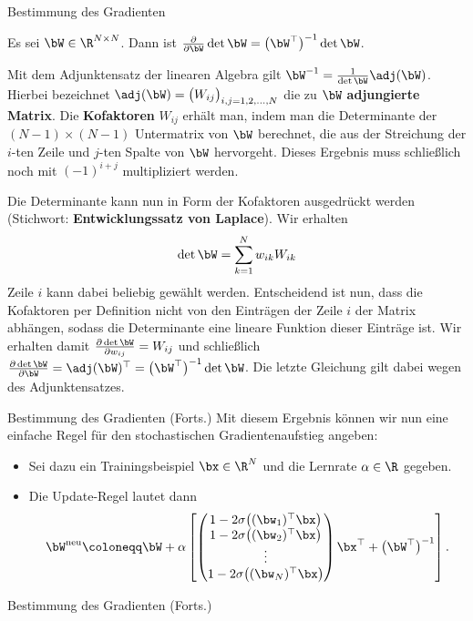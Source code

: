 \begin{frame}{Bestimmung des Gradienten}{}
	\begin{mytheo}
		Es sei $\bW \in \R^{N \times N}$. Dann ist
		$\frac{\partial}{\partial \bW} \det \bW = \bigl( \bW^\top \bigr)^{-1} \det \bW$.
	\end{mytheo}

	\begin{myproof}
		Mit dem Adjunktensatz der linearen Algebra gilt $\bW^{-1} = \frac{1}{\det \bW} \adj(\bW)$.
		Hierbei bezeichnet $\adj(\bW) = \bigl( W_{ij} \bigr)_{i,j = 1, 2, \ldots, N}$ die zu $\bW$ \textbf{adjungierte Matrix}.
		Die \textbf{Kofaktoren} $W_{ij}$ erhält man, indem man die Determinante der
		$(N - 1) \times (N - 1)$ Untermatrix von $\bW$ berechnet, die aus der Streichung der $i$-ten Zeile und $j$-ten Spalte
		von $\bW$ hervorgeht. Dieses Ergebnis muss schließlich noch mit $(-1)^{i + j}$ multipliziert werden.
		
		Die Determinante kann nun in Form der Kofaktoren ausgedrückt werden
		(Stichwort: \textbf{Entwicklungssatz von Laplace}). Wir erhalten
		\begin{equation*}
			\det \bW = \sum_{k = 1}^N w_{ik} W_{ik}
		\end{equation*}
		Zeile $i$ kann dabei beliebig gewählt werden. Entscheidend ist nun, dass die Kofaktoren per Definition
		nicht von den Einträgen der Zeile $i$ der Matrix abhängen, sodass die Determinante eine lineare Funktion
		dieser Einträge ist. Wir erhalten damit
		$\frac{\partial \det \bW}{\partial w_{ij}} = W_{ij}$ und schließlich
		$\frac{\partial \det \bW}{\partial \bW} = \adj(\bW)^\top = \bigl( \bW^\top \bigr)^{-1} \det \bW$.
		Die letzte Gleichung gilt dabei wegen des Adjunktensatzes.
	\end{myproof}
\end{frame}


\begin{frame}{Bestimmung des Gradienten (Forts.)}{}
	Mit diesem Ergebnis können wir nun eine einfache Regel für den stochastischen Gradientenaufstieg angeben:
	\begin{itemize}
		\item Sei dazu ein Trainingsbeispiel $\bx \in \R^N$  und die Lernrate $\alpha \in \R$ gegeben.
		\item Die Update-Regel lautet dann
		\begin{equation}
			\bW^{\text{neu}} \coloneqq \bW + \alpha \left[
				\begin{pmatrix}
					1 - 2 \sigma\bigl( (\bw_1)^\top \bx \bigr) \\
					1 - 2 \sigma\bigl( (\bw_2)^\top \bx \bigr) \\
					\vdots \\
					1 - 2 \sigma\bigl( (\bw_N)^\top \bx \bigr)
				\end{pmatrix} \bx^\top + \bigl( \bW^\top \bigr)^{-1}
			\right].
		\end{equation}
	\end{itemize}
\end{frame}


\begin{frame}{Bestimmung des Gradienten (Forts.)}{}
	\begin{myproof}

	\end{myproof}
\end{frame}